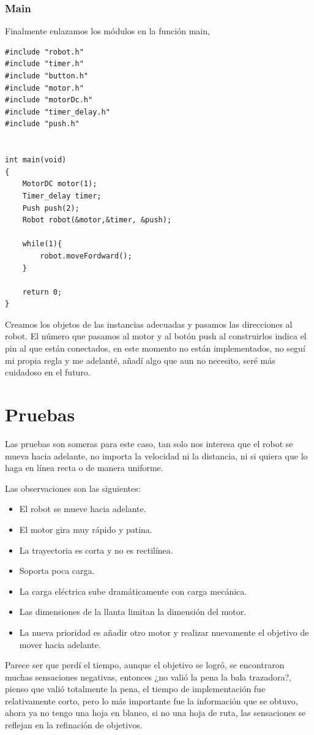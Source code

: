 \subsubsection{Main}
Finalmente enlazamos los módulos en la función main,
\begin{verbatim}
#include "robot.h"
#include "timer.h"
#include "button.h"
#include "motor.h"
#include "motorDc.h"
#include "timer_delay.h"
#include "push.h"


int main(void)
{
	MotorDC motor(1);
	Timer_delay timer;
	Push push(2);
	Robot robot(&motor,&timer, &push);

	while(1){
		robot.moveFordward();
	}

	return 0;
}
\end{verbatim}
Creamos los objetos de las instancias adecuadas y pasamos las direcciones al 
robot. El número que pasamos al motor y al botón push al construirlos indica el
pin al que están conectados, en este momento no están implementados, no seguí mi
propia regla y me adelanté, añadí algo que aun no necesito, seré más cuidadoso en
el futuro. 
\section{Pruebas}
Las pruebas son someras para este caso, tan solo nos interesa que el robot se 
mueva hacia adelante, no importa la velocidad ni la distancia, ni si quiera que lo
haga en línea recta o de manera uniforme.

Las observaciones son las siguientes:
\begin{itemize}
	\item El robot se mueve hacia adelante.
	\item El motor gira muy rápido y patina.
	\item La trayectoria es corta y no es rectilínea. 
	\item Soporta poca carga.
	\item La carga eléctrica sube dramáticamente con carga mecánica. 
	\item Las dimensiones de la llanta limitan la dimensión del motor.
	\item La nueva prioridad es añadir otro motor y realizar nuevamente el objetivo
		de mover hacia adelante.
\end{itemize}

Parece ser que perdí el tiempo, aunque el objetivo se logró, se encontraron muchas 
sensaciones negativas, entonces ¿no valió la pena la bala trazadora?, pienso que 
valió totalmente la pena, el tiempo de implementación fue relativamente corto,
pero lo más importante fue la información que se obtuvo, ahora ya no tengo una
hoja en blanco, si no una hoja de ruta, las sensaciones se reflejan en la refinación
de objetivos.


